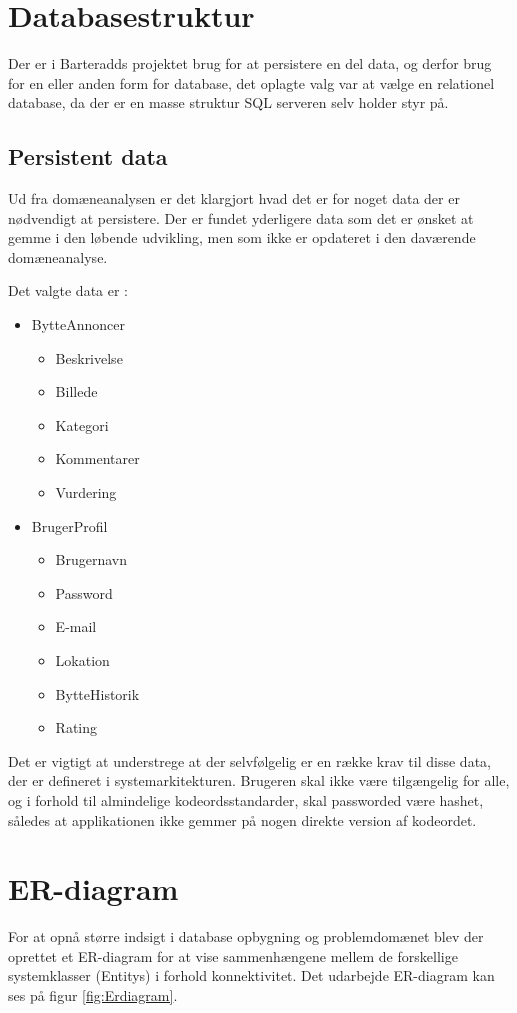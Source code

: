 \section{Databasestruktur}
Der er i Barteradds projektet brug for at persistere en del data, og derfor brug for en eller anden form for database, det oplagte valg var at vælge en relationel database, da der er en masse struktur SQL serveren selv holder styr på.

\subsection{Persistent data}
Ud fra domæneanalysen er det klargjort hvad det er for noget data der er nødvendigt at persistere. Der er fundet yderligere data som det er ønsket at gemme i den løbende udvikling, men som ikke er opdateret i den daværende domæneanalyse.

Det valgte data er :
\begin{itemize}
	\item BytteAnnoncer
	\begin{itemize}
		\item Beskrivelse 
		\item Billede 
		\item Kategori
		\item Kommentarer
		\item Vurdering
	\end{itemize}
	\item BrugerProfil
	\begin{itemize}
		\item Brugernavn
		\item Password
		\item E-mail
		\item Lokation
		\item BytteHistorik
		\item Rating
	\end{itemize}
\end{itemize} 

Det er vigtigt at understrege at der selvfølgelig er en række krav til disse data, der er defineret i systemarkitekturen. Brugeren skal ikke være tilgængelig for alle, og i forhold til almindelige kodeordsstandarder, skal passworded være hashet, således at applikationen ikke gemmer på nogen direkte version af kodeordet. 

\section{ER-diagram}
For at opnå større indsigt i database opbygning og problemdomænet blev der oprettet et ER-diagram for at vise sammenhængene mellem de forskellige systemklasser (Entitys) i forhold konnektivitet. Det udarbejde ER-diagram kan ses på figur \ref{fig:Erdiagram}.

